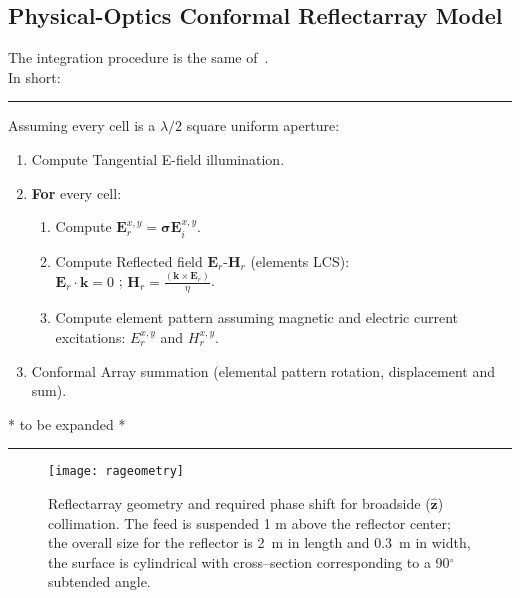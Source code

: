 \documentclass[11pt, a4paper]{scrartcl}
\newcommand{\degrees}{\ensuremath{^\circ}}
\begin{document}
    \subsection{Physical-Optics Conformal Reflectarray Model}
    \label{subsec:physical_optics_conformal_reflectarray_model}
    The integration procedure is the same of~\cite{PradoCrosspolar2017}.\\
    In short:\\
    \noindent\rule{\textwidth}{0.4pt}
    \begin{ttfamily}
        \small
        Assuming every cell is a $\lambda/2$ square uniform aperture:
        \begin{enumerate}
            \item Compute Tangential E-field illumination.
            \item \textbf{For} every cell:
            \begin{enumerate}
                \item Compute $\mathbf{E}_{r}^{x,y} = \mathbf{\sigma} \mathbf{E}_{i}^{x,y}$.
                \item Compute Reflected field $\mathbf{E}_{r}$-$\mathbf{H}_{r}$ (elements LCS):\\
                $\mathbf{E}_{r} \cdot \mathbf{k} = 0$ ; $\mathbf{H}_{r} = \frac{(\mathbf{k} \times \mathbf{E}_{r})}{\eta}$.
                \item Compute element pattern assuming magnetic and electric current \\excitations:
                ${E}_{r}^{x,y}$ and ${H}_{r}^{x,y}$.
            \end{enumerate}
            \item Conformal Array summation (elemental pattern rotation, displacement and sum).
        \end{enumerate}
    \end{ttfamily}
    * to be expanded *\\
    \noindent\rule{\textwidth}{0.4pt}


    \begin{figure}[!t]
        \texttt{[image: rageometry]}
        \caption{Reflectarray geometry and required phase shift for broadside ($\mathbf{\hat{z}}$) collimation.
        The feed is suspended 1 m above the reflector center; the overall size for the reflector is 2~m in
        length and 0.3~m in width, the surface is cylindrical with cross--section corresponding to a 90\degrees
        subtended angle.}
        \label{fig:rageom}
    \end{figure}
\end{document}
